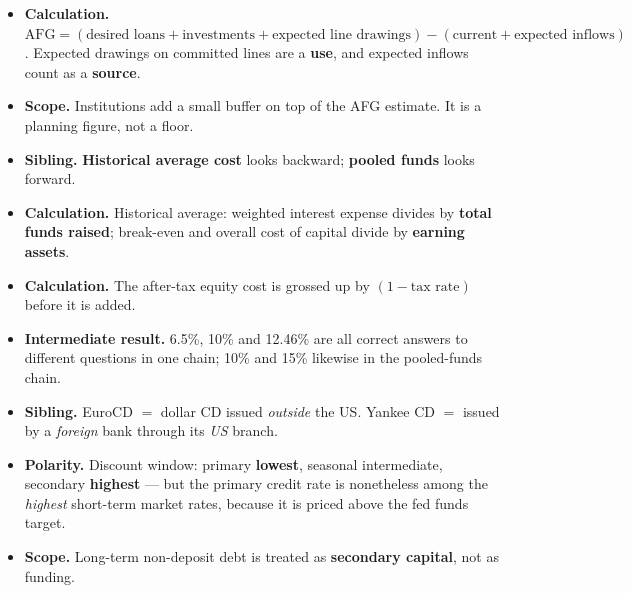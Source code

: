 \begin{lrtrapbox}
\begin{itemize}
\item \textbf{Calculation.} $\text{AFG} = (\text{desired loans} + \text{investments} + \text{expected line drawings}) - (\text{current} + \text{expected inflows})$. Expected drawings on committed lines are a \textbf{use}, and expected inflows count as a \textbf{source}.
\item \textbf{Scope.} Institutions add a small buffer on top of the AFG estimate. It is a planning figure, not a floor.
\item \textbf{Sibling.} \textbf{Historical average cost} looks backward; \textbf{pooled funds} looks forward.
\item \textbf{Calculation.} Historical average: weighted interest expense divides by \textbf{total funds raised}; break-even and overall cost of capital divide by \textbf{earning assets}.
\item \textbf{Calculation.} The after-tax equity cost is grossed up by $(1 - \text{tax rate})$ before it is added.
\item \textbf{Intermediate result.} 6.5\%, 10\% and 12.46\% are all correct answers to different questions in one chain; 10\% and 15\% likewise in the pooled-funds chain.
\item \textbf{Sibling.} EuroCD $=$ dollar CD issued \emph{outside} the US. Yankee CD $=$ issued by a \emph{foreign} bank through its \emph{US} branch.
\item \textbf{Polarity.} Discount window: primary \textbf{lowest}, seasonal intermediate, secondary \textbf{highest} --- but the primary credit rate is nonetheless among the \emph{highest} short-term market rates, because it is priced above the fed funds target.
\item \textbf{Scope.} Long-term non-deposit debt is treated as \textbf{secondary capital}, not as funding.
\end{itemize}
\end{lrtrapbox}
